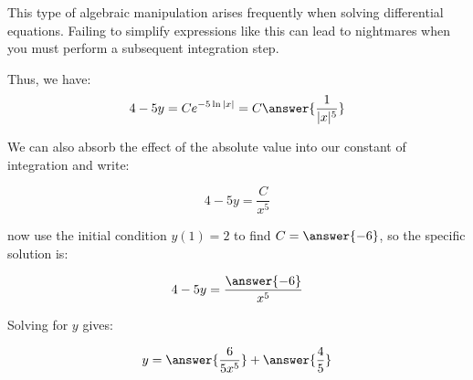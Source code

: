 \documentclass{ximera}
\begin{document}
\begin{exercise}
\begin{hint}
\begin{question}
\begin{question}
\begin{remark}
This type of algebraic manipulation arises frequently when solving differential equations.  Failing to simplify expressions like this can lead to nightmares when you must perform a subsequent integration step.
\end{remark}

Thus, we have:
\[
4-5y = Ce^{-5 \ln|x|} = C\answer{\frac{1}{|x|^5}}
\]

We can also absorb the effect of the absolute value into our constant of integration and write:

\[
4-5y = \frac{C}{x^5}
\]

 now use the initial condition $y(1) = 2$ to find $C = \answer{-6}$, so the specific solution is:

\[
4-5y = \frac{\answer{-6}}{x^5}
\]

Solving for $y$ gives:

\[
y = \answer{\frac{6}{5x^5}}+\answer{\frac{4}{5}}
\]

\end{question}
\end{question}
 \end{hint}
 
\end{exercise}
\end{document}
